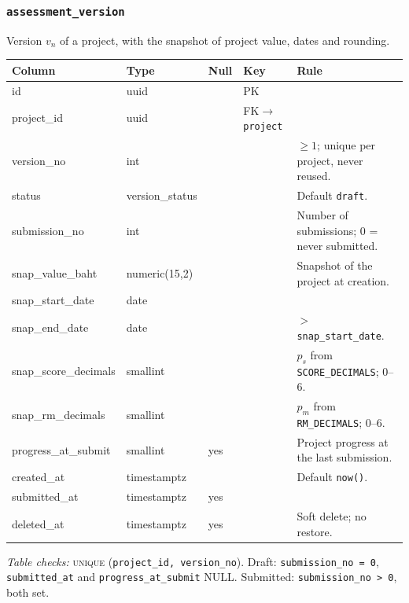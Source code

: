 \documentclass[11pt,a4paper]{article}
\begin{document}
\subsubsection*{\texttt{assessment\_version}}
\noindent Version $v_n$ of a project, with the snapshot of project value, dates and rounding.\par\vspace{2pt}
{\footnotesize\setlength{\tabcolsep}{4pt}\noindent\begin{tabularx}{\linewidth}{@{}>{\ttfamily\raggedright\arraybackslash}p{3.2cm} >{\ttfamily\raggedright\arraybackslash}p{3.15cm} >{\centering\arraybackslash}p{0.6cm} >{\raggedright\arraybackslash}p{3.85cm} Y@{}}
\toprule{}\normalfont Column & \normalfont Type & Null & Key & Rule \\ \midrule
id & uuid &  & PK &  \\
project\_id & uuid &  & FK$\to$\texttt{project} &  \\
version\_no & int &  &  & $\ge 1$; unique per project, never reused. \\
status & version\_status &  &  & Default \texttt{draft}. \\
submission\_no & int &  &  & Number of submissions; 0 = never submitted. \\
snap\_value\_baht & numeric(15,2) &  &  & Snapshot of the project at creation. \\
snap\_start\_date & date &  &  &  \\
snap\_end\_date & date &  &  & $>$ \texttt{snap\_start\_date}. \\
snap\_score\_decimals & smallint &  &  & $p_s$ from \texttt{SCORE\_DECIMALS}; 0--6. \\
snap\_rm\_decimals & smallint &  &  & $p_m$ from \texttt{RM\_DECIMALS}; 0--6. \\
progress\_at\_submit & smallint & yes &  & Project progress at the last submission. \\
created\_at & timestamptz &  &  & Default \texttt{now()}. \\
submitted\_at & timestamptz & yes &  &  \\
deleted\_at & timestamptz & yes &  & Soft delete; no restore. \\
\bottomrule\end{tabularx}}
{\footnotesize\noindent\textit{Table checks:} \textsc{unique} (\texttt{project\_id, version\_no}). Draft: \texttt{submission\_no = 0}, \texttt{submitted\_at} and \texttt{progress\_at\_submit} NULL. Submitted: \texttt{submission\_no > 0}, both set.\par}
\end{document}
